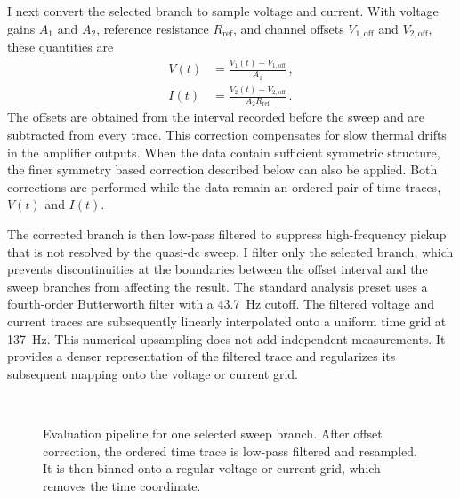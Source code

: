             I next convert the selected branch to sample voltage and current. With voltage gains $A_1$ and $A_2$, reference resistance $R_\mathrm{ref}$, and channel offsets $V_{1,\mathrm{off}}$ and $V_{2,\mathrm{off}}$, these quantities are
            \begin{equation}
                \begin{aligned}
                    V(t) &= \frac{V_1(t) - V_{1,\mathrm{off}}}{A_1}\,, \\
                    I(t) &= \frac{V_2(t) - V_{2,\mathrm{off}}}{A_2 R_\mathrm{ref}}\,.
                \end{aligned}
                \label{eq:methods:digital:raw-iv}
            \end{equation}
            The offsets are obtained from the interval recorded before the sweep and are subtracted from every trace. This correction compensates for slow thermal drifts in the amplifier outputs. When the data contain sufficient symmetric structure, the finer symmetry based correction described below can also be applied. Both corrections are performed while the data remain an ordered pair of time traces, $V(t)$ and $I(t)$.

            The corrected branch is then low-pass filtered to suppress high-frequency pickup that is not resolved by the quasi-dc sweep. I filter only the selected branch, which prevents discontinuities at the boundaries between the offset interval and the sweep branches from affecting the result. The standard analysis preset uses a fourth-order Butterworth filter with a \qty{43.7}{\hertz} cutoff. The filtered voltage and current traces are subsequently linearly interpolated onto a uniform time grid at \qty{137}{\hertz}. This numerical upsampling does not add independent measurements. It provides a denser representation of the filtered trace and regularizes its subsequent mapping onto the voltage or current grid.

            \begin{figure}[t]
                \centering
                \hfill
                \\
                \hfill
                \caption{Evaluation pipeline for one selected sweep branch. After offset correction, the ordered time trace is low-pass filtered and resampled. It is then binned onto a regular voltage or current grid, which removes the time coordinate.}
                \label{fig:methods:digital:eva}
            \end{figure}

